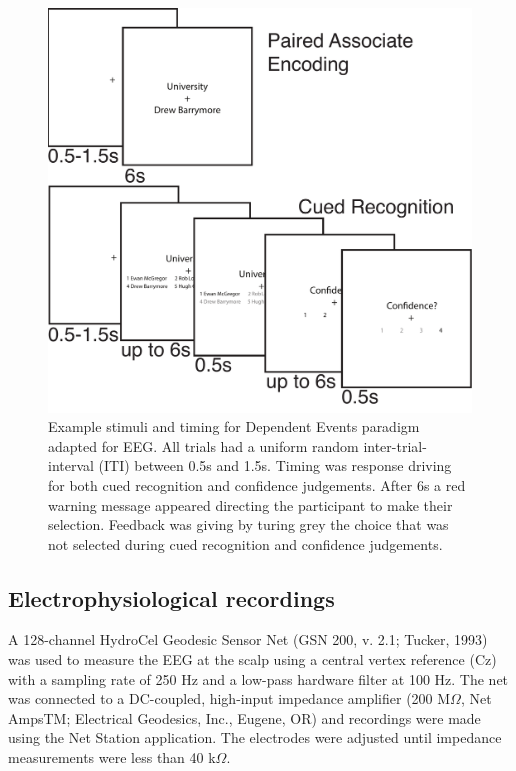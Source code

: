 \documentclass[11pt, titlepage, twoside]{article}
\begin{document}
\begin{figure}
	\includegraphics[width=.5\textwidth]{figs/deevTask.pdf}
	\caption[EEG Dependent Events Task]{
		Example stimuli and timing for Dependent Events paradigm adapted for EEG.  All trials had a uniform random inter-trial-interval (ITI) between 0.5s and 1.5s.  Timing was response driving for both cued recognition and confidence judgements.  After 6s a red warning message appeared directing the participant to make their selection.  Feedback was giving by turing grey the choice that was not selected during cued recognition and confidence judgements.  
	}
	\label{fig:deevTask}
\end{figure}



\subsection{Electrophysiological recordings}
A 128-channel HydroCel Geodesic Sensor Net (GSN 200, v. 2.1; Tucker, 1993) was used to measure the EEG at the scalp using a central vertex reference (Cz) with a sampling rate of 250 Hz and a low-pass hardware filter at 100 Hz. The net was connected to a DC-coupled, high-input impedance amplifier (200 M$\Omega$, Net AmpsTM; Electrical Geodesics, Inc., Eugene, OR) and recordings were made using the Net Station application. The electrodes were adjusted until impedance measurements were less than 40 k$\Omega$.
\end{document}
